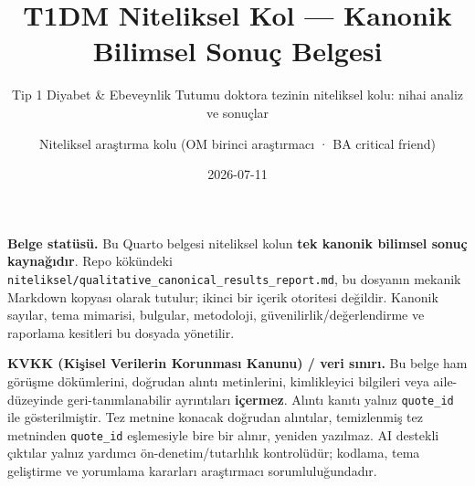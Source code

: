 \documentclass[
  turkish,
  a4paper,
  DIV=11,
  numbers=noendperiod]{scrreprt}
\title{T1DM Niteliksel Kol --- Kanonik Bilimsel Sonuç Belgesi}
\subtitle{Tip 1 Diyabet \& Ebeveynlik Tutumu doktora tezinin niteliksel
kolu: nihai analiz ve sonuçlar}
\author{Niteliksel araştırma kolu (OM birinci araştırmacı · BA critical
friend)}
\date{2026-07-11}
\renewcommand*\contentsname{İçindekiler}
\newcommand\contentsname{İçindekiler}
\begin{document}
\maketitle

\renewcommand*\contentsname{İçindekiler}
{
\setcounter{tocdepth}{2}
\tableofcontents
}

\begin{tcolorbox}[enhanced jigsaw, arc=.35mm, bottomrule=.15mm, breakable, colback=white, colframe=quarto-callout-note-color-frame, left=2mm, leftrule=.75mm, opacityback=0, rightrule=.15mm, toprule=.15mm]
\begin{minipage}[t]{5.5mm}
\textcolor{quarto-callout-note-color}{\faInfo}
\end{minipage}%
\begin{minipage}[t]{\textwidth - 5.5mm}

\textbf{Belge statüsü.} Bu Quarto belgesi niteliksel kolun \textbf{tek
kanonik bilimsel sonuç kaynağıdır}. Repo kökündeki
\texttt{niteliksel/qualitative\_canonical\_results\_report.md}, bu
dosyanın mekanik Markdown kopyası olarak tutulur; ikinci bir içerik
otoritesi değildir. Kanonik sayılar, tema mimarisi, bulgular,
metodoloji, güvenilirlik/değerlendirme ve raporlama kesitleri bu dosyada
yönetilir.

\end{minipage}%
\end{tcolorbox}

\begin{tcolorbox}[enhanced jigsaw, arc=.35mm, bottomrule=.15mm, breakable, colback=white, colframe=quarto-callout-important-color-frame, left=2mm, leftrule=.75mm, opacityback=0, rightrule=.15mm, toprule=.15mm]
\begin{minipage}[t]{5.5mm}
\textcolor{quarto-callout-important-color}{\faExclamation}
\end{minipage}%
\begin{minipage}[t]{\textwidth - 5.5mm}

\textbf{KVKK (Kişisel Verilerin Korunması Kanunu) / veri sınırı.} Bu
belge ham görüşme dökümlerini, doğrudan alıntı metinlerini, kimlikleyici
bilgileri veya aile-düzeyinde geri-tanımlanabilir ayrıntıları
\textbf{içermez}. Alıntı kanıtı yalnız \texttt{quote\_id} ile
gösterilmiştir. Tez metnine konacak doğrudan alıntılar, temizlenmiş tez
metninden \texttt{quote\_id} eşlemesiyle bire bir alınır, yeniden
yazılmaz. AI destekli çıktılar yalnız yardımcı ön-denetim/tutarlılık
kontrolüdür; kodlama, tema geliştirme ve yorumlama kararları araştırmacı
sorumluluğundadır.

\end{minipage}%
\end{tcolorbox}
\end{document}
